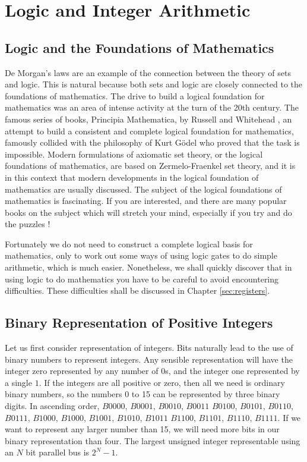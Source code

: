 \documentclass[../physical_computing.tex]{subfiles}
\begin{document}
\section{Logic and Integer Arithmetic}
\label{sec:logic_and_integers}

\subsection{Logic and the Foundations of Mathematics}
\label{sec:logicandmathsfoundations}

De Morgan's laws are an example of the connection between the theory of sets and logic. This is natural because both sets and logic are closely connected to the foundations of mathematics. The drive to build a logical foundation for mathematics was an area of intense activity at the turn of the 20th century. The famous series of books, Principia Mathematica, by Russell and Whitehead \cite{Whitehead:268025}, an attempt to build a consistent and complete logical foundation for mathematics, famously collided with the philosophy of Kurt G\"odel who proved that the task is impossible. Modern formulations of axiomatic set theory, or the logical foundations of mathematics, are based on Zermelo-Fraenkel set theory, and it is in this context that modern developments in the logical foundation of mathematics are usually discussed. The subject of the logical foundations of mathematics is fascinating. If you are interested, and there are many popular books on the subject which will stretch your mind, especially if you try and do the puzzles \cite{Hofstadter:99665,Smullyan} !

Fortunately we do not need to construct a complete logical basis for mathematics, only to work out some ways of using logic gates to do simple arithmetic, which is much easier. Nonetheless, we shall quickly discover that in using logic to do mathematics you have to be careful to avoid encountering difficulties. These difficulties shall be discussed in Chapter \ref{sec:registers}.

\subsection{Binary Representation of Positive Integers}
\label{sec:postiveintegers}

Let us first consider representation of integers. Bits naturally lead to the use of binary numbers to represent integers. Any sensible representation will have the integer zero represented by any number of $0$s, and the integer one represented by a single $1$. If the integers are all positive or zero, then all we need is ordinary binary numbers, so the numbers 0 to 15 can be represented by three binary digits. In ascending order, $B0000$, $B0001$, $B0010$, $B0011$ $B0100$, $B0101$, $B0110$, $B0111$, $B1000$, $B1000$, $B1001$, $B1010$, $B1011$ $B1100$, $B1101$, $B1110$, $B1111$. If we want to represent any larger number than 15, we will need more bits in our binary representation than four. The largest unsigned integer representable using an $N$ bit parallel bus is $2^N-1$.
\end{document}
